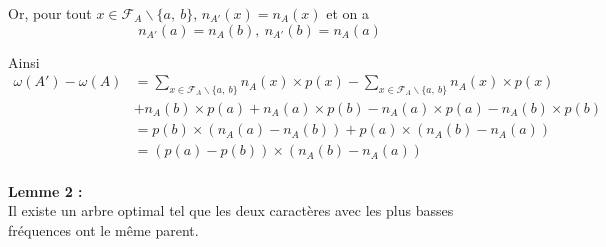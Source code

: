 \documentclass[a4paper, 12pt]{article}
\let\qed\square
\begin{document}
Or, pour tout $x \in \mathcal{F}_A\backslash\{a,\ b\}$, $n_{A'}(x) = n_A(x)$ et on a \\
$$
n_{A'}(a) = n_{A}(b),\ n_{A'}(b) = n_{A}(a)
$$

Ainsi
\begin{align*}
\omega(A')-\omega(A) &= \sum_{x\in \mathcal{F}_A\backslash\{a,\ b\}} n_A(x)\times p(x)‎‎-\sum_{x\in \mathcal{F}_A\backslash\{a,\ b\}} n_A(x)\times p(x)‎‎ \\
&+ n_A(b)\times p(a) + n_A(a)\times p(b) - n_A(a)\times p(a) - n_A(b)\times p(b) \\
&= p(b)\times(n_A(a)-n_A(b)) + p(a)\times(n_A(b)-n_A(a)) \\
&= (p(a)-p(b))\times(n_A(b)-n_A(a))
\end{align*}
\qed \\

\textbf{Lemme 2 :} \\
Il existe un arbre optimal tel que les deux caractères avec les plus basses fréquences ont le même parent. \\
\end{document}
